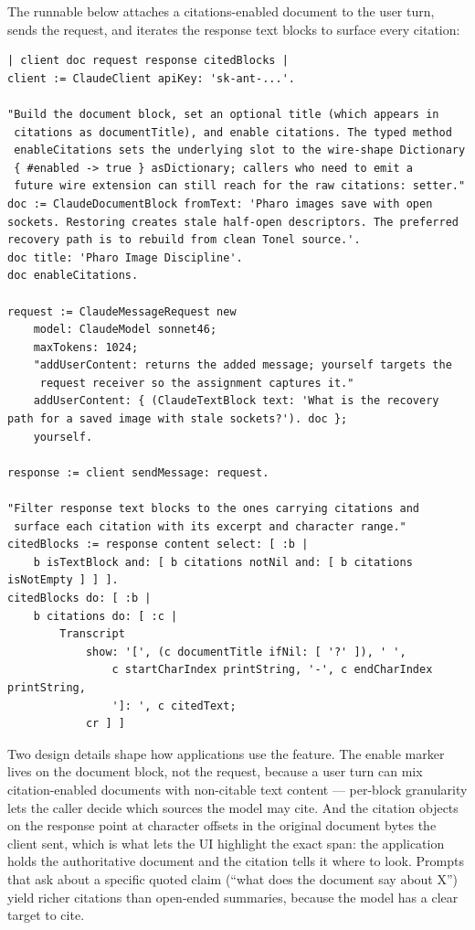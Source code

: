 \documentclass[a4paper,10pt,fleqn]{article}
\begin{document}
The runnable below attaches a citations-enabled document to the
user turn, sends the request, and iterates the response text blocks
to surface every citation:

\begin{lstlisting}[language={}]
| client doc request response citedBlocks |
client := ClaudeClient apiKey: 'sk-ant-...'.

"Build the document block, set an optional title (which appears in
 citations as documentTitle), and enable citations. The typed method
 enableCitations sets the underlying slot to the wire-shape Dictionary
 { #enabled -> true } asDictionary; callers who need to emit a
 future wire extension can still reach for the raw citations: setter."
doc := ClaudeDocumentBlock fromText: 'Pharo images save with open sockets. Restoring creates stale half-open descriptors. The preferred recovery path is to rebuild from clean Tonel source.'.
doc title: 'Pharo Image Discipline'.
doc enableCitations.

request := ClaudeMessageRequest new
    model: ClaudeModel sonnet46;
    maxTokens: 1024;
    "addUserContent: returns the added message; yourself targets the
     request receiver so the assignment captures it."
    addUserContent: { (ClaudeTextBlock text: 'What is the recovery path for a saved image with stale sockets?'). doc };
    yourself.

response := client sendMessage: request.

"Filter response text blocks to the ones carrying citations and
 surface each citation with its excerpt and character range."
citedBlocks := response content select: [ :b |
    b isTextBlock and: [ b citations notNil and: [ b citations isNotEmpty ] ] ].
citedBlocks do: [ :b |
    b citations do: [ :c |
        Transcript
            show: '[', (c documentTitle ifNil: [ '?' ]), ' ',
                c startCharIndex printString, '-', c endCharIndex printString,
                ']: ', c citedText;
            cr ] ]
\end{lstlisting}

Two design details shape how applications use the feature.  The
enable marker lives on the document block, not the request, because
a user turn can mix citation-enabled documents with non-citable
text content --- per-block granularity lets the caller decide which
sources the model may cite.  And the citation objects on the
response point at character offsets in the original document bytes
the client sent, which is what lets the UI highlight the exact
span: the application holds the authoritative document and the
citation tells it where to look.  Prompts that ask about a specific
quoted claim (``what does the document say about X'') yield richer
citations than open-ended summaries, because the model has a clear
target to cite.
\end{document}
